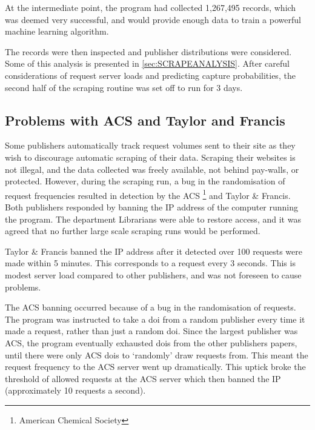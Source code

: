 At the intermediate point, the program had collected 1,267,495 records, which was deemed very successful, and would provide enough data to train a powerful machine learning algorithm.

The records were then inspected and publisher distributions were considered. Some of this analysis is presented in \ref{sec:SCRAPEANALYSIS}. After careful considerations of request server loads and predicting capture probabilities, the second half of the scraping routine was set off to run for 3 days.
\label{sec:CROSSREFSCRAPE}
\subsection{Problems with ACS and Taylor and Francis}
Some publishers automatically track request volumes sent to their site as they wish to discourage automatic scraping of their data. Scraping their websites is not illegal, and the data collected was freely available, not behind pay-walls, or protected. However, during the scraping run, a bug in the randomisation of request frequencies resulted in detection by the ACS \footnote{American Chemical Society} and Taylor \& Francis. Both publishers responded by banning the IP address of the computer running the program. The department Librarians were able to restore access, and it was agreed that no further large scale scraping runs would be performed. 

Taylor \& Francis banned the IP address after it detected over 100 requests were made within 5 minutes. This corresponds to a request every 3 seconds. This is modest server load compared to other publishers, and was not foreseen to cause problems.

The ACS banning occurred because of a bug in the randomisation of requests. The program was instructed to take a doi from a random publisher every time it made a request, rather than just a random doi. Since the largest publisher was ACS, the program eventually exhausted dois from the other publishers papers, until there were only ACS dois to `randomly' draw requests from. This meant the request frequency to the ACS server went up dramatically. This uptick broke the threshold of allowed requests at the ACS server which then banned the IP (approximately 10 requests a second).

